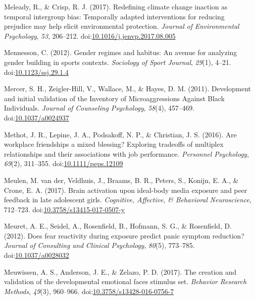 \documentclass[english,man]{apa6}
\theoremstyle{definition}
\theoremstyle{definition}
\theoremstyle{definition}
\theoremstyle{remark}
\begin{document}
\hypertarget{ref-Meleady2017}{}
Meleady, R., \& Crisp, R. J. (2017). Redefining climate change inaction
as temporal intergroup bias: Temporally adapted interventions for
reducing prejudice may help elicit environmental protection.
\emph{Journal of Environmental Psychology}, \emph{53}, 206--212.
doi:\href{https://doi.org/10.1016/j.jenvp.2017.08.005}{10.1016/j.jenvp.2017.08.005}

\hypertarget{ref-Mennesson2012}{}
Mennesson, C. (2012). Gender regimes and habitus: An avenue for
analyzing gender building in sports contexts. \emph{Sociology of Sport
Journal}, \emph{29}(1), 4--21.
doi:\href{https://doi.org/10.1123/ssj.29.1.4}{10.1123/ssj.29.1.4}

\hypertarget{ref-Mercer2011}{}
Mercer, S. H., Zeigler-Hill, V., Wallace, M., \& Hayes, D. M. (2011).
Development and initial validation of the Inventory of Microaggressions
Against Black Individuals. \emph{Journal of Counseling Psychology},
\emph{58}(4), 457--469.
doi:\href{https://doi.org/10.1037/a0024937}{10.1037/a0024937}

\hypertarget{ref-Methot2016}{}
Methot, J. R., Lepine, J. A., Podsakoff, N. P., \& Christian, J. S.
(2016). Are workplace friendships a mixed blessing? Exploring tradeoffs
of multiplex relationships and their associations with job performance.
\emph{Personnel Psychology}, \emph{69}(2), 311--355.
doi:\href{https://doi.org/10.1111/peps.12109}{10.1111/peps.12109}

\hypertarget{ref-VanderMeulen2017}{}
Meulen, M. van der, Veldhuis, J., Braams, B. R., Peters, S., Konijn, E.
A., \& Crone, E. A. (2017). Brain activation upon ideal-body media
exposure and peer feedback in late adolescent girls. \emph{Cognitive,
Affective, \& Behavioral Neuroscience}, 712--723.
doi:\href{https://doi.org/10.3758/s13415-017-0507-y}{10.3758/s13415-017-0507-y}

\hypertarget{ref-Meuret2012}{}
Meuret, A. E., Seidel, A., Rosenfield, B., Hofmann, S. G., \&
Rosenfield, D. (2012). Does fear reactivity during exposure predict
panic symptom reduction? \emph{Journal of Consulting and Clinical
Psychology}, \emph{80}(5), 773--785.
doi:\href{https://doi.org/10.1037/a0028032}{10.1037/a0028032}

\hypertarget{ref-Meuwissen2017}{}
Meuwissen, A. S., Anderson, J. E., \& Zelazo, P. D. (2017). The creation
and validation of the developmental emotional faces stimulus set.
\emph{Behavior Research Methods}, \emph{49}(3), 960--966.
doi:\href{https://doi.org/10.3758/s13428-016-0756-7}{10.3758/s13428-016-0756-7}
\end{document}
